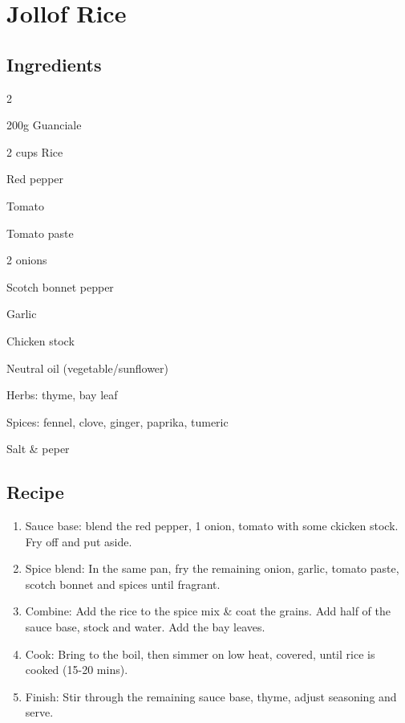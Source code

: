 \section{Jollof Rice}

\subsection*{Ingredients}
\begin{multicols}{2}
\begin{ingredients}
    \item 200g Guanciale
    \item 2 cups Rice
    \item Red pepper
    \item Tomato
    \item Tomato paste
    \item 2 onions
    \item Scotch bonnet pepper
    \item Garlic
    \item Chicken stock
    \item Neutral oil (vegetable/sunflower)
    \item Herbs: thyme, bay leaf
    \item Spices: fennel, clove, ginger, paprika, tumeric
    \item Salt \& peper
\end{ingredients}
\end{multicols}

\subsection*{Recipe}
\begin{enumerate}
    \item Sauce base: blend the red pepper, 1 onion, tomato with some ckicken stock. Fry off and put aside. 
    \item Spice blend: In the same pan, fry the remaining onion, garlic, tomato paste, scotch bonnet and spices until fragrant.
    \item Combine: Add the rice to the spice mix \& coat the grains. Add half of the sauce base, stock and water. Add the bay leaves.
    \item Cook: Bring to the boil, then simmer on low heat, covered, until rice is cooked (15-20 mins).
    \item Finish: Stir through the remaining sauce base, thyme, adjust seasoning and serve.
\end{enumerate}

